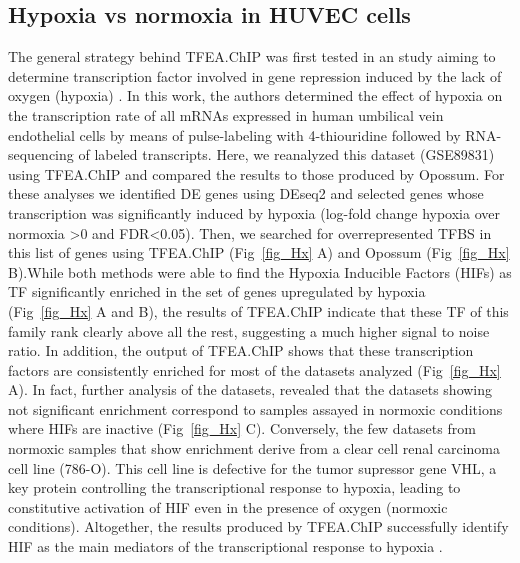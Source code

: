 \documentclass[10pt,letterpaper]{article}
\begin{document}
	\subsection{Hypoxia vs normoxia in HUVEC cells}
	The general strategy behind TFEA.ChIP was first tested in an study aiming to determine transcription factor involved in gene repression induced by the lack of oxygen (hypoxia) \cite{Tiana2018a}. In this work, the authors determined the effect of hypoxia on the transcription rate of all mRNAs expressed in human umbilical vein endothelial cells by means of pulse-labeling with 4-thiouridine followed by RNA-sequencing of labeled transcripts. Here, we reanalyzed this dataset (GSE89831) using TFEA.ChIP and compared the results to those produced by Opossum. For these analyses we identified DE genes using DEseq2 \cite{Love2014} and selected genes whose transcription was significantly induced by hypoxia (log-fold change hypoxia over normoxia >0 and FDR<0.05). Then, we searched for overrepresented TFBS in this list of genes using TFEA.ChIP (Fig~\ref{fig_Hx} A) and Opossum (Fig~\ref{fig_Hx} B).While both methods were able to find the Hypoxia Inducible Factors (HIFs) as TF significantly enriched in the set of genes upregulated by hypoxia (Fig~\ref{fig_Hx} A and B), the results of TFEA.ChIP indicate that these TF of this family rank clearly above all the rest, suggesting a much higher signal to noise ratio. In addition, the output of TFEA.ChIP shows that these transcription factors are consistently enriched for most of the datasets analyzed (Fig~\ref{fig_Hx} A). In fact, further analysis of the datasets, revealed that the datasets showing not significant enrichment correspond to samples assayed in normoxic conditions where HIFs are inactive (Fig~\ref{fig_Hx} C). Conversely, the few datasets from normoxic samples that show enrichment derive from a clear cell renal carcinoma cell line (786-O). This cell line is defective for the tumor supressor gene VHL, a key protein controlling the transcriptional response to hypoxia, leading to constitutive activation of HIF even in the presence of oxygen (normoxic conditions). Altogether, the results produced by TFEA.ChIP successfully identify HIF as the main mediators of the transcriptional response to hypoxia .
	
\end{document}
